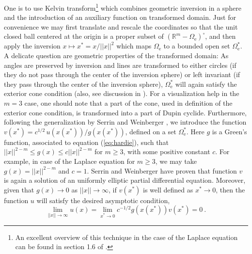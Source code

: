 \documentclass[12pt]{iopart}
\newcommand{\be}{\begin{equation}}
\newcommand{\ee}{\end{equation}}
\newcommand{\0}{\vct{0}}
\newcommand{\rr}{\mathds{R}}
\theoremstyle{plain} \newtheorem{tm}{Theorem}[section]
\theoremstyle{plain} \newtheorem{lm}[tm]{Lemma}
\theoremstyle{definition} \newtheorem{defn}[tm]{Definition}
\begin{document}
One is to use Kelvin transform\footnote{An excellent overview of this technique in the case of the Laplace equation can be found in section 1.6 of \cite{AG}.} which combines geometric inversion in a sphere and the introduction of an auxiliary function on transformed domain. Just for convenience we may first translate and rescale the coordinates so that the unit closed ball centered at the origin is a proper subset of $(\rr^m - \Omega_{\mathrm{e}})^\circ$, and then apply the inversion $x \mapsto x^* = x/||x||^2$ which maps $\Omega_{\mathrm{e}}$ to a bounded open set $\Omega_{\mathrm{e}}^*$. A delicate question are geometric properties of the transformed domain: As angles are preserved by inversion and lines are transformed to either circles (if they do not pass through the center of the inversion sphere) or left invariant (if they pass through the center of the inversion sphere), $\Omega_{\mathrm{e}}^*$ will again satisfy the exterior cone condition (also, see discussion in \cite{MM03}). For a visualization help in the $m=3$ case, one should note that a part of the cone, used in definition of the exterior cone condition, is transformed into a part of Dupin cyclide. Furthermore, following the generalization by Serrin and Weinberger \cite{SW66}, we introduce the function $v(x^*) = c^{1/2} \, u(x(x^*))/g(x(x^*))$, defined on a set $\Omega_{\mathrm{e}}^*$. Here $g$ is a Green's function, associated to equation (\ref{eq:hardie}), such that $||x||^{2-m} \le g(x) \le c||x||^{2-m}$ for $m \ge 3$, with some positive constant $c$. For example, in case of the Laplace equation for $m \ge 3$, we may take $g(x) = ||x||^{2-m}$ and $c = 1$. Serrin and Weinberger have proven that function $v$ is again a solution of an uniformly elliptic partial differential equation. Moreover, given that $g(x) \to 0$ as $||x|| \to \infty$, if $v(x^*)$ is well defined as $x^* \to 0$, then the function $u$ will satisfy the desired asymptotic condition,
\be
\lim_{||x|| \to \infty} u(x) = \lim_{x^* \to 0} c^{-1/2} g(x(x^*)) v(x^*) = 0 \ .
\ee
\end{document}

